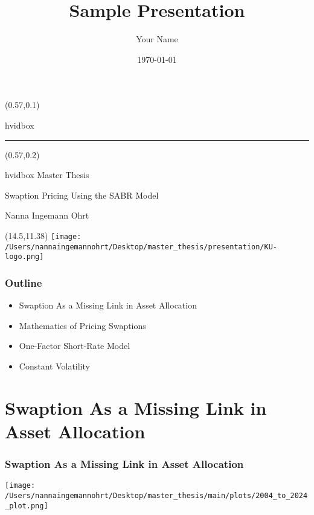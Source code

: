 \documentclass{beamer}
\title{Sample Presentation}
\author{Your Name}
\date{\today}
\begin{document}
{
\begin{frame}[plain] 
    \begin{textblock*}{\textwidth}(0.57\textwidth,0.1\textheight)
        \begin{beamercolorbox}[wd=7.8cm,ht=7.3cm,sep=0.5cm]{hvidbox}
            \fontsize{5}{10}\selectfont {}
            \noindent\textcolor{KUrod}{\rule{6.8cm}{0.4pt}}
        \end{beamercolorbox}
    \end{textblock*}
    \begin{textblock*}{\textwidth}(0.57\textwidth,0.2\textheight) 
        \begin{beamercolorbox}[wd=7.8cm,sep=0.5cm]{hvidbox}
                \Huge \textcolor{KUrod}{Master Thesis}
                \vspace{0.5cm}
                \par
                \Large Swaption Pricing Using the SABR Model
                \vspace{0.5cm}
                \par
                \normalsize Nanna Ingemann Ohrt
        \end{beamercolorbox}
    \end{textblock*}
    \begin{textblock}{1}(14.5,11.38)
        \texttt{[image: /Users/nannaingemannohrt/Desktop/master\_thesis/presentation/KU-logo.png]}
    \end{textblock}
\end{frame}
}

\begin{frame}
    \frametitle{{\textcolor{KUrod}{Outline}}}
    \begin{itemize}[label=\textcolor{KUrod}{\textbullet}]
        \item Swaption As a Missing Link in Asset Allocation
        \item Mathematics of Pricing Swaptions
        \item One-Factor Short-Rate Model
        \item Constant Volatility
    \end{itemize}
\end{frame}
    

\section{Swaption As a Missing Link in Asset Allocation}
\begin{frame}
    \frametitle{\textcolor{KUrod}{Swaption As a Missing Link in Asset Allocation}}
    \begin{center}
        \texttt{[image: /Users/nannaingemannohrt/Desktop/master\_thesis/main/plots/2004\_to\_2024\_plot.png]}
    \end{center}
\end{frame}
\end{document}
